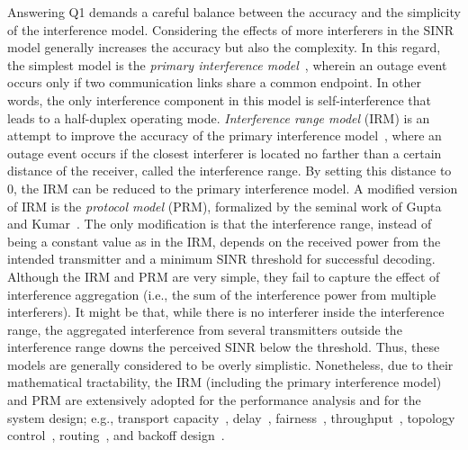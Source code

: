 \documentclass[12pt, draftclsnofoot, onecolumn]{IEEEtran}
\begin{document}
Answering Q1 demands a careful balance between the accuracy and the simplicity of the interference model. Considering the effects of more interferers in the SINR model generally increases the accuracy but also the complexity. In this regard, the simplest model is the \emph{primary interference model}~\cite{ephremides1987design}, wherein an outage event occurs only if two communication links share a common endpoint. In other words, the only interference component in this model is self-interference that leads to a half-duplex operating mode. \emph{Interference range model} (IRM) is an attempt to improve the accuracy of the primary interference model~\cite{iyer2009right}, where an outage event occurs if the closest interferer is located no farther than a certain distance of the receiver, called the interference range. By setting this distance to 0, the IRM can be reduced to the primary interference model. A modified version of IRM is the \emph{protocol model} (PRM), formalized by the seminal work of Gupta and Kumar~\cite{gupta2000capacity}. The only modification is that the interference range, instead of being a constant value as in the IRM, depends on the received power from the intended transmitter and a minimum SINR threshold for successful decoding. Although the IRM and PRM are very simple, they fail to capture the effect of interference aggregation (i.e., the sum of the interference power from multiple interferers). It might be that, while there is no interferer inside the interference range, the aggregated interference from several transmitters outside the interference range downs the perceived SINR below the threshold. Thus, these models are generally considered to be overly simplistic. Nonetheless, due to their mathematical tractability, the IRM (including the primary interference model) and PRM are extensively adopted for the performance analysis and for the system design; e.g., transport capacity~\cite{gupta2000capacity,liu2003capacity,kyasanur2009capacity}, delay~\cite{gamal2004throughput,el2006optimal}, fairness~\cite{nandagopal2000achieving}, throughput~\cite{xu2002effective,Singh2011Interference,Yu2016Distributed}, topology control~\cite{marina2010topology,Stahlbuhk2016Topology}, routing~\cite{jain2005impact}, and backoff design~\cite{celik2010mac}.
\end{document}
